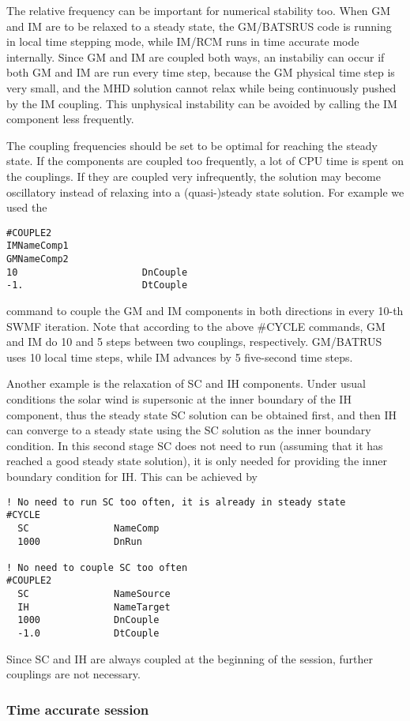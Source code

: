 The relative frequency can be important for numerical
stability too. When GM and IM are to be relaxed
to a steady state, the GM/BATSRUS code is running in 
local time stepping mode, while IM/RCM runs in time 
accurate mode internally. Since GM and IM are coupled
both ways, an instabiliy can occur if both GM and IM
are run every time step, because the GM physical time
step is very small, and the MHD solution cannot relax
while being continuously pushed by the IM coupling.
This unphysical instability can be avoided by calling the
IM component less frequently.

The coupling frequencies should be set to be optimal
for reaching the steady state. If the components are
coupled too frequently, a lot of CPU time is spent
on the couplings. If they are coupled very infrequently,
the solution may become oscillatory instead of relaxing
into a (quasi-)steady state solution. For example
we used the
\begin{verbatim}
#COUPLE2
IMNameComp1
GMNameComp2
10                      DnCouple
-1.                     DtCouple
\end{verbatim}
command to couple the GM and IM components in both directions
in every 10-th SWMF iteration.
Note that according to the above \#CYCLE commands,
GM and IM do 10 and 5 steps between two couplings,
respectively. GM/BATRUS uses 10 local time steps,
while IM advances by 5 five-second time steps.

Another example is the relaxation of SC and IH components.
Under usual conditions the solar wind is supersonic at the 
inner boundary of the IH component, thus the steady state SC
solution can be obtained first, and then IH can converge
to a steady state using the SC solution as the inner boundary 
condition. In this second stage SC does not need to run
(assuming that it has reached a good steady state solution),
it is only needed for providing the inner boundary condition for IH.
This can be achieved by
\begin{verbatim}
! No need to run SC too often, it is already in steady state
#CYCLE
  SC               NameComp
  1000             DnRun

! No need to couple SC too often
#COUPLE2
  SC               NameSource
  IH               NameTarget
  1000             DnCouple
  -1.0             DtCouple
\end{verbatim}
Since SC and IH are always coupled at the beginning of the session,
further couplings are not necessary.

\subsubsection{Time accurate session}

